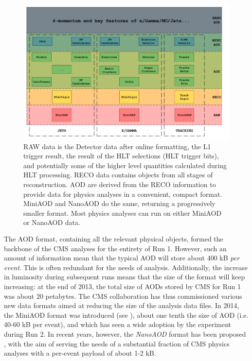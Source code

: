 \begin{figure}
    \centering
     \includegraphics[width=\columnwidth]{gfx/ch2/data_tiers.pdf}
    \caption[Data Tiers]{RAW data is the Detector data after online formatting, the L1 trigger result, the result of the HLT selections (HLT trigger bits), and potentially some of the higher level quantities calculated during HLT processing. RECO data contains objects from all stages of reconstruction. AOD are derived from the RECO information to provide data for physics analyses in a convenient, compact format. MiniAOD and NanoAOD do the same, returning a progressively smaller format. Most physics analyses can run on either MiniAOD or NanoAOD data.}
    \label{fig:datatier}
\end{figure}

The AOD format, containing all the relevant physical objects, formed the backbone of the CMS analyses for the entirety of Run 1. However, such an amount of information mean that the typical AOD will store about 400 kB \emph{per event}. This is often redundant for the needs of analysis. Additionally, the increase in luminosity during subsequent runs means that the size of the format will keep increasing: at the end of 2013, the total size of AODs stored by CMS for Run 1 was about 20 petabytes. The CMS collaboration has thus commissioned various new data formats aimed at reducing the size of the analysis data files.
In 2014, the MiniAOD format was introduced (see \cite{Petrucciani_2015}), about one tenth the size of AOD (i.e. 40-60 kB per event), and which has seen a wide adoption by the experiment during Run 2. In recent years, however, the \emph{NanoAOD} format has been proposed \cite{Rizzi:2699585}, with the aim of serving the needs of a substantial fraction of CMS physics analyses with a per-event payload of about 1-2 kB.

